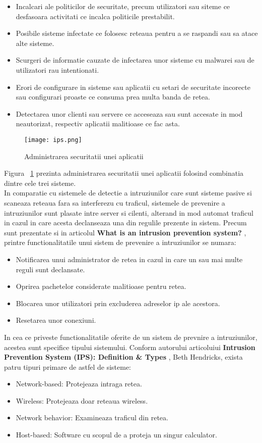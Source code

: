 \begin{itemize}
	\item Incalcari ale politicilor de securitate, precum utilizatori sau siteme ce desfasoara activitati ce incalca politicile prestabilit.
	\item Posibile sisteme infectate ce folosesc reteaua pentru a se raspandi sau sa atace alte sisteme.
	\item Scurgeri de informatie cauzate de infectarea unor sisteme cu malwarei sau de utilizatori rau intentionati.
	\item Erori de configurare in sisteme sau aplicatii cu setari de securitate incorecte sau configurari proaste ce consuma prea multa banda de retea.
	\item Detectarea unor clienti sau servere ce acceseaza sau sunt accesate in mod neautorizat, respectiv aplicatii malitioase ce fac asta.
\end{itemize}
\begin{figure}[h]
	\centering
	\texttt{[image: ips.png]}
	\caption{Administrarea securitatii unei aplicatii}
	\label{fig:ips-example}
\end{figure}

Figura ~\ref{fig:ips-example} prezinta administrarea securitatii unei aplicatii folosind combinatia dintre cele trei sisteme. \\

In comparatie cu sistemele de detectie a intruziunilor care sunt sisteme pasive si scaneaza reteaua fara sa interferezu cu traficul, sistemele de prevenire a intruziunilor sunt plasate intre server si cilenti, alterand in mod automat traficul in cazul in care acesta declanseaza una din regulile prezente in sistem. Precum sunt prezentate si in articolul \textbf{What is an intrusion prevention system?} \cite{what_is_ips}, printre functionalitatile unui sistem de prevenire a intruziunilor se numara:
\begin{itemize}
	\item Notificarea unui administrator de retea in cazul in care un sau mai multe reguli sunt declansate.
	\item Oprirea pachetelor considerate malitioase pentru retea.
	\item Blocarea unor utilizatori prin excluderea adreselor ip ale acestora.
	\item Resetarea unor conexiuni.
\end{itemize}

In cea ce priveste functionalitatile oferite de un sistem de prevnire a intruziunilor, acestea sunt specifice tipului sistemului. Conform autorului articoluiui \textbf{Intrusion Prevention System (IPS): Definition \& Types} \cite{ips_types}, Beth Hendricks, exista patru tipuri primare de astfel de sisteme:
\begin{itemize}
	\item Network-based: Protejeaza intraga retea.
	\item Wireless: Protejeaza doar reteaua wireless.
	\item Network behavior: Examineaza traficul din retea.
	\item Host-based: Software cu scopul de a proteja un singur calculator.
\end{itemize}

